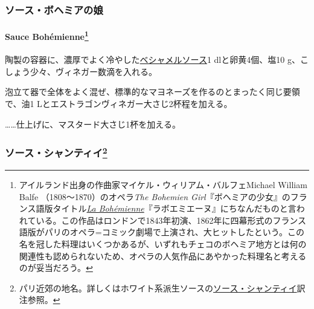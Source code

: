 \begin{recette}
\hypertarget{ux30bdux30fcux30b9ux30dcux30d8ux30dfux30a2ux306eux5a18}{%
\subsubsection{ソース・ボヘミアの娘}\label{ux30bdux30fcux30b9ux30dcux30d8ux30dfux30a2ux306eux5a18}}

\hypertarget{sauce-bohemienne}{%
\paragraph[Sauce Bohémienne]{\texorpdfstring{Sauce Bohémienne\footnote{アイルランド出身の作曲家マイケル・ウィリアム・バルフェMichael
  William Balfe （1808〜1870）のオペラ\emph{The Bohemien
  Girl}『ボヘミアの少女』のフランス語版タイトル\href{https://archive.org/details/labohmiennegrand00balf}{\emph{La
  Bohémienne}}『ラボエミエーヌ』にちなんだものと言われている。この作品はロンドンで1843年初演、1862年に四幕形式のフランス語版がパリのオペラ=コミック劇場で上演され、大ヒットしたという。この名を冠した料理はいくつかあるが、いずれもチェコのボヘミア地方とは何の関連性も認められないため、オペラの人気作品にあやかった料理名と考えるのが妥当だろう。}}{Sauce Bohémienne}}\label{sauce-bohemienne}}


陶製の容器に、濃厚でよく冷やした\protect\hyperlink{sauce-bechamel}{ベシャメルソース}1\undemi{}
dlと卵黄4個、塩10 g、こしょう少々、ヴィネガー数滴を入れる。

泡立て器で全体をよく混ぜ、標準的なマヨネーズを作るのとまったく同じ要領で、油1
Lとエストラゴンヴィネガー大さじ2杯程を加える。

\ldots{}\ldots{}仕上げに、マスタード大さじ1杯を加える。

\maeaki

\hypertarget{ux30bdux30fcux30b9ux30b7ux30e3ux30f3ux30c6ux30a3ux30a47}{%
\subsubsection[ソース・シャンティイ]{\texorpdfstring{ソース・シャンティイ\footnote{パリ近郊の地名。詳しくはホワイト系派生ソースの\protect\hyperlink{sauce-chantilly}{ソース・シャンティイ}訳注参照。}}{ソース・シャンティイ}}\label{ux30bdux30fcux30b9ux30b7ux30e3ux30f3ux30c6ux30a3ux30a47}}


\end{recette}
